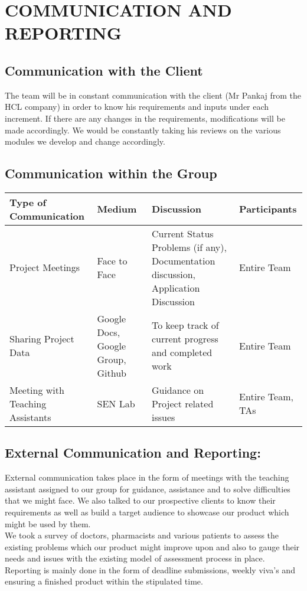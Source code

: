 \documentclass[
10pt, %
a4paper, %
oneside, %
headinclude,footinclude, %
BCOR5mm, %
]{scrartcl}
\begin{document}
\section{ COMMUNICATION AND REPORTING}
\subsection{ Communication with the Client}
The team will be in constant communication with the client (Mr Pankaj from the HCL company) in order to know his requirements and inputs under each increment. If there are any changes in the requirements, modiﬁcations will be made accordingly. We would be constantly taking his reviews on the various modules we develop and change accordingly.

\subsection{ Communication within the Group}
\begin{table}[h!]
\begin{tabular}{|| p{3cm}| p{3cm}| p{3cm}| p{3cm}||} 
 \hline
Type of Communication &
Medium & Discussion & Participants\\ [1.5ex] 
 \hline\hline
Project Meetings & Face to Face &
Current Status Problems (if any),  Documentation discussion, Application Discussion& Entire Team\\
\hline
Sharing Project Data &
Google Docs, Google Group, Github &
To keep track of current progress and completed work &
Entire Team\\
\hline 
Meeting with Teaching Assistants &
SEN Lab &
Guidance on Project related issues&
Entire Team, TAs\\[1ex] 
 \hline
\end{tabular}
\end{table}
\subsection{External Communication and Reporting:}

External communication takes place in the form of  meetings with the teaching assistant assigned to our group for guidance, assistance and to solve difficulties that we might face. We also talked to our prospective clients to know their requirements as well as build a target audience to showcase our product which might be used by them.\vspace{0.5cm}
\\We took a survey of doctors, pharmacists and various patients  to assess the existing problems which our product might improve upon and also to gauge their needs and issues with the existing model of assessment process in place.
\vspace{1cm}
\\Reporting is mainly done in the form of deadline submissions, weekly viva’s and ensuring a finished product within the stipulated time.
\end{document}
